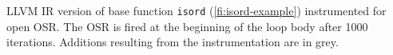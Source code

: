 \label{fig:isordfrom} LLVM IR version of base function {\tt isord} (\myfigure\ref{fi:isord-example}) instrumented for open OSR. The OSR is fired at the beginning of the loop body after 1000 iterations. Additions resulting from the instrumentation are in grey.
